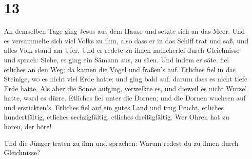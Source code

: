 \hypertarget{section-12}{%
\section{13}\label{section-12}}

 An demselben Tage ging Jesus aus dem Hause und setzte
sich an das Meer.  Und es versammelte sich viel Volks zu
ihm, also dass er in das Schiff trat und saß, und alles Volk stand am
Ufer.  Und er redete zu ihnen mancherlei durch Gleichnisse
und sprach: Siehe, es ging ein Sämann aus, zu säen.  Und
indem er säte, fiel etliches an den Weg; da kamen die Vögel und fraßen's
auf.  Etliches fiel in das Steinige, wo es nicht viel Erde
hatte; und ging bald auf, darum dass es nicht tiefe Erde hatte.
 Als aber die Sonne aufging, verwelkte es, und dieweil es
nicht Wurzel hatte, ward es dürre.  Etliches fiel unter
die Dornen; und die Dornen wuchsen auf und erstickten's. 
Etliches fiel auf ein gutes Land und trug Frucht, etliches
hundertfältig, etliches sechzigfältig, etliches dreißigfältig.
 Wer Ohren hat zu hören, der höre!

 Und die Jünger traten zu ihm und sprachen: Warum redest
du zu ihnen durch Gleichnisse?


